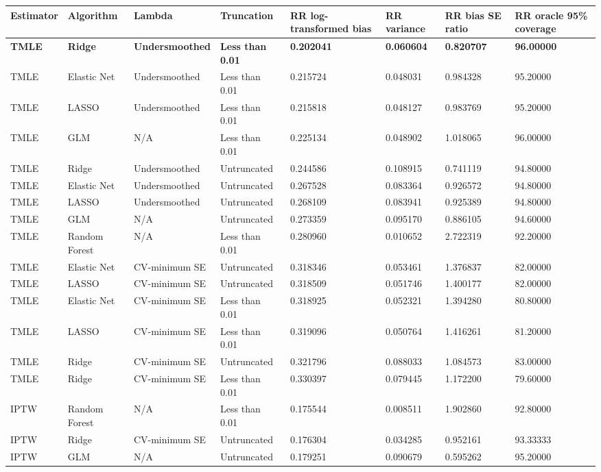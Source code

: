 
\begin{longtable}[l]{llllllll}
\toprule
Estimator & Algorithm & Lambda & Truncation & RR log-transformed bias & RR variance & RR bias SE ratio & RR oracle 95\% coverage\\
\midrule
\midrule
\textbf{TMLE} & \textbf{Ridge} & \textbf{Undersmoothed} & \textbf{Less than 0.01} & \textbf{0.202041} & \textbf{0.060604} & \textbf{0.820707} & \textbf{96.00000}\\
\midrule
TMLE & Elastic Net & Undersmoothed & Less than 0.01 & 0.215724 & 0.048031 & 0.984328 & 95.20000\\
TMLE & LASSO & Undersmoothed & Less than 0.01 & 0.215818 & 0.048127 & 0.983769 & 95.20000\\
TMLE & GLM & N/A & Less than 0.01 & 0.225134 & 0.048902 & 1.018065 & 96.00000\\
TMLE & Ridge & Undersmoothed & Untruncated & 0.244586 & 0.108915 & 0.741119 & 94.80000\\
TMLE & Elastic Net & Undersmoothed & Untruncated & 0.267528 & 0.083364 & 0.926572 & 94.80000\\
TMLE & LASSO & Undersmoothed & Untruncated & 0.268109 & 0.083941 & 0.925389 & 94.80000\\
TMLE & GLM & N/A & Untruncated & 0.273359 & 0.095170 & 0.886105 & 94.60000\\
TMLE & Random Forest & N/A & Less than 0.01 & 0.280960 & 0.010652 & 2.722319 & 92.20000\\
TMLE & Elastic Net & CV-minimum SE & Untruncated & 0.318346 & 0.053461 & 1.376837 & 82.00000\\
TMLE & LASSO & CV-minimum SE & Untruncated & 0.318509 & 0.051746 & 1.400177 & 82.00000\\
TMLE & Elastic Net & CV-minimum SE & Less than 0.01 & 0.318925 & 0.052321 & 1.394280 & 80.80000\\
TMLE & LASSO & CV-minimum SE & Less than 0.01 & 0.319096 & 0.050764 & 1.416261 & 81.20000\\
TMLE & Ridge & CV-minimum SE & Untruncated & 0.321796 & 0.088033 & 1.084573 & 83.00000\\
TMLE & Ridge & CV-minimum SE & Less than 0.01 & 0.330397 & 0.079445 & 1.172200 & 79.60000\\
IPTW & Random Forest & N/A & Less than 0.01 & 0.175544 & 0.008511 & 1.902860 & 92.80000\\
IPTW & Ridge & CV-minimum SE & Untruncated & 0.176304 & 0.034285 & 0.952161 & 93.33333\\
IPTW & GLM & N/A & Untruncated & 0.179251 & 0.090679 & 0.595262 & 95.20000\\

\end{longtable}
